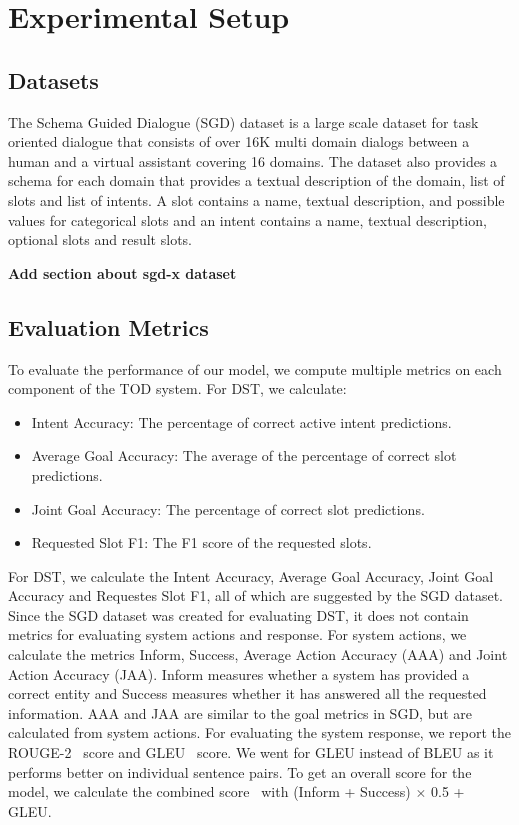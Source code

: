 \section{Experimental Setup}


\subsection{Datasets}

The Schema Guided Dialogue (SGD) dataset is a large scale dataset for task oriented dialogue that consists of over 16K multi domain
dialogs between a human and a virtual assistant covering 16 domains. The dataset also provides a schema for each domain that
provides a textual description of the domain, list of slots and list of intents. A slot contains a name, textual description,
and possible values for categorical slots and an intent contains a name, textual description, optional slots and result slots.

\textbf{Add section about sgd-x dataset}

\subsection{Evaluation Metrics}

To evaluate the performance of our model, we compute multiple metrics on each component of the TOD system.
For DST, we calculate:
\begin{itemize}
    \item Intent Accuracy: The percentage of correct active intent predictions.
    \item Average Goal Accuracy: The average of the percentage of correct slot predictions.
    \item Joint Goal Accuracy: The percentage of correct slot predictions.
    \item Requested Slot F1: The F1 score of the requested slots.
\end{itemize}

For DST, we calculate the Intent Accuracy, Average Goal Accuracy, Joint Goal Accuracy and Requestes Slot F1, all of which
are suggested by the SGD dataset. Since the SGD dataset was created for evaluating DST, it does not contain metrics for evaluating system
actions and response. For system actions, we calculate the metrics Inform, Success, Average Action Accuracy (AAA) and Joint Action Accuracy (JAA).
Inform measures whether a system has provided a correct entity and Success measures whether it has answered all the requested
information. AAA and JAA are similar to the goal metrics in SGD, but are calculated from system actions.
For evaluating the system response, we report the ROUGE-2~\cite{lin2004looking} score and GLEU~\cite{wu2016googles} score.
We went for GLEU instead of BLEU as it performs better on individual sentence pairs.
To get an overall score for the model, we calculate the combined score~\cite{mehri2019structured} with (Inform + Success) $\times$ 0.5 + GLEU.


